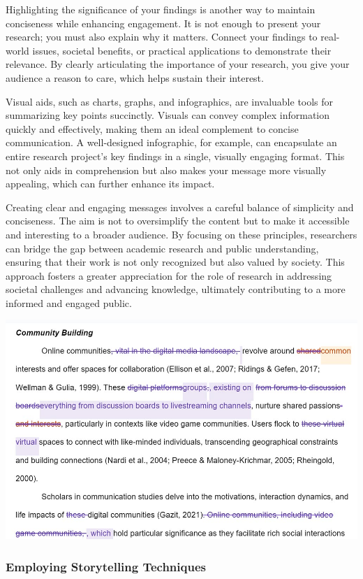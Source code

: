 \documentclass[
]{book}
\begin{document}
Highlighting the significance of your findings is another way to maintain conciseness while enhancing engagement. It is not enough to present your research; you must also explain why it matters. Connect your findings to real-world issues, societal benefits, or practical applications to demonstrate their relevance. By clearly articulating the importance of your research, you give your audience a reason to care, which helps sustain their interest.

Visual aids, such as charts, graphs, and infographics, are invaluable tools for summarizing key points succinctly. Visuals can convey complex information quickly and effectively, making them an ideal complement to concise communication. A well-designed infographic, for example, can encapsulate an entire research project's key findings in a single, visually engaging format. This not only aids in comprehension but also makes your message more visually appealing, which can further enhance its impact.

Creating clear and engaging messages involves a careful balance of simplicity and conciseness. The aim is not to oversimplify the content but to make it accessible and interesting to a broader audience. By focusing on these principles, researchers can bridge the gap between academic research and public understanding, ensuring that their work is not only recognized but also valued by society. This approach fosters a greater appreciation for the role of research in addressing societal challenges and advancing knowledge, ultimately contributing to a more informed and engaged public.

\includegraphics[width=1\textwidth,height=\textheight]{images/fig087.jpg}

\subsubsection*{Employing Storytelling Techniques}\label{employing-storytelling-techniques-1}
\end{document}
